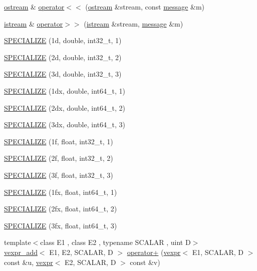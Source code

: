 \begin{DoxyCompactItemize}
\item 
\hyperlink{classmui_1_1ostream}{ostream} \& \hyperlink{namespacemui_a31a6e16316f20c68b388076995a6c47c}{operator$<$$<$} (\hyperlink{classmui_1_1ostream}{ostream} \&stream, const \hyperlink{structmui_1_1message}{message} \&m)
\item 
\hyperlink{classmui_1_1istream}{istream} \& \hyperlink{namespacemui_a5311e744d62b82539f8da80c4860b1e2}{operator$>$$>$} (\hyperlink{classmui_1_1istream}{istream} \&stream, \hyperlink{structmui_1_1message}{message} \&m)
\item 
\hyperlink{namespacemui_a16db97eaebe6d42a21eb1e6526c74ea9}{S\+P\+E\+C\+I\+A\+L\+I\+ZE} (1d, double, int32\+\_\+t, 1)
\item 
\hyperlink{namespacemui_abef396787f6d06c26122fd5f351bdff8}{S\+P\+E\+C\+I\+A\+L\+I\+ZE} (2d, double, int32\+\_\+t, 2)
\item 
\hyperlink{namespacemui_afea035163ebcc3cfcd835d0fffaf8b3c}{S\+P\+E\+C\+I\+A\+L\+I\+ZE} (3d, double, int32\+\_\+t, 3)
\item 
\hyperlink{namespacemui_aad0c4d72595e2eaf95455da9003582e7}{S\+P\+E\+C\+I\+A\+L\+I\+ZE} (1dx, double, int64\+\_\+t, 1)
\item 
\hyperlink{namespacemui_ae90cf19cde9273b862009049d10ed9bb}{S\+P\+E\+C\+I\+A\+L\+I\+ZE} (2dx, double, int64\+\_\+t, 2)
\item 
\hyperlink{namespacemui_a9671464a00d907e4a5e03fa4aad5bf39}{S\+P\+E\+C\+I\+A\+L\+I\+ZE} (3dx, double, int64\+\_\+t, 3)
\item 
\hyperlink{namespacemui_a8762a37dd8a42ab065f7085d67b03c93}{S\+P\+E\+C\+I\+A\+L\+I\+ZE} (1f, float, int32\+\_\+t, 1)
\item 
\hyperlink{namespacemui_abfb0f037c71db20bfb5df9d347151af8}{S\+P\+E\+C\+I\+A\+L\+I\+ZE} (2f, float, int32\+\_\+t, 2)
\item 
\hyperlink{namespacemui_a4af8bc6ddbd0194be30c3f0ebdac17fc}{S\+P\+E\+C\+I\+A\+L\+I\+ZE} (3f, float, int32\+\_\+t, 3)
\item 
\hyperlink{namespacemui_aa8e0ea14aacfee616f9862659a98ba25}{S\+P\+E\+C\+I\+A\+L\+I\+ZE} (1fx, float, int64\+\_\+t, 1)
\item 
\hyperlink{namespacemui_ae0530fa1ea185466956a11fe4433d4b2}{S\+P\+E\+C\+I\+A\+L\+I\+ZE} (2fx, float, int64\+\_\+t, 2)
\item 
\hyperlink{namespacemui_aa66b013326b6a064e1a6699afa81e30a}{S\+P\+E\+C\+I\+A\+L\+I\+ZE} (3fx, float, int64\+\_\+t, 3)
\item 
{\footnotesize template$<$class E1 , class E2 , typename S\+C\+A\+L\+AR , uint D$>$ }\\\hyperlink{structmui_1_1vexpr__add}{vexpr\+\_\+add}$<$ E1, E2, S\+C\+A\+L\+AR, D $>$ \hyperlink{namespacemui_a8f282990f9dab2d809dc062d6142e212}{operator+} (\hyperlink{structmui_1_1vexpr}{vexpr}$<$ E1, S\+C\+A\+L\+AR, D $>$ const \&u, \hyperlink{structmui_1_1vexpr}{vexpr}$<$ E2, S\+C\+A\+L\+AR, D $>$ const \&v)

\end{DoxyCompactItemize}
